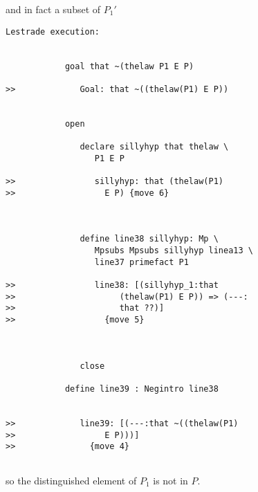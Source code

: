 \documentclass[12pt]{article}
\begin{document}
and in fact a subset of $P_1'$

\begin{verbatim}Lestrade execution:


            goal that ~(thelaw P1 E P)

>>             Goal: that ~((thelaw(P1) E P))


            open

               declare sillyhyp that thelaw \
                  P1 E P

>>                sillyhyp: that (thelaw(P1)
>>                  E P) {move 6}



               define line38 sillyhyp: Mp \
                  Mpsubs Mpsubs sillyhyp linea13 \
                  line37 primefact P1

>>                line38: [(sillyhyp_1:that
>>                     (thelaw(P1) E P)) => (---:
>>                     that ??)]
>>                  {move 5}



               close

            define line39 : Negintro line38


>>             line39: [(---:that ~((thelaw(P1)
>>                  E P)))]
>>               {move 4}


\end{verbatim}

so the distinguished element of $P_1$ is not in $P$.
\end{document}
